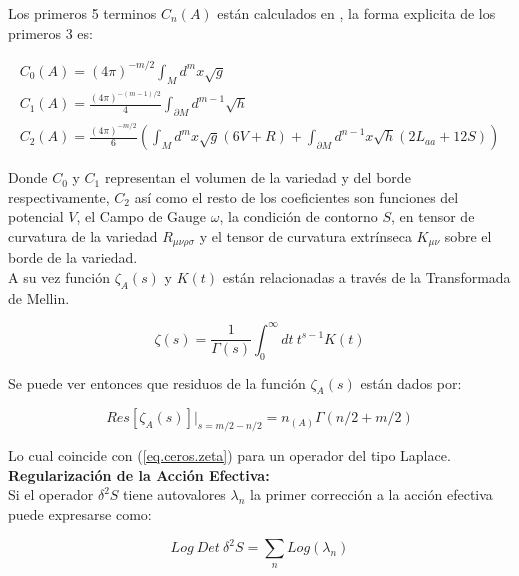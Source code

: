 Los primeros 5 terminos $C _n (A) $ están calculados en \cite{VASSILEVICH2003279}, la forma explicita de los primeros 3 es: 

\begin{equation}
\begin{array}{c}
C _0 (A) = (4 \pi ) ^{-m/2}  \int _M d ^m x \sqrt{g}  \\
C _1 (A) = \frac{(4 \pi) ^{-(m-1)/2} }{4} \int _{\partial M } d ^{m-1} \sqrt{h} \\
C _2 (A) = \frac{(4 \pi) ^{-m/2} }{6} \left(
									\int _M d ^m x\sqrt{g} (6 V + R) +
									\int _{\partial M } d ^{n-1} x 
									\sqrt{h} (2 L _{aa}  + 12 S)
									\right)
\end{array}
\end{equation} 

Donde $C _0$ y $C _1$ representan el volumen de la variedad y del borde respectivamente, $C _2$ así como el resto de los coeficientes son funciones del potencial $V$, el Campo de Gauge $\omega $, la condición de contorno $S$, en tensor de curvatura de la variedad $R _{\mu \nu \rho \sigma }$ y el tensor de curvatura extrínseca $K _{\mu \nu }$ sobre el borde de la variedad. \\

A su vez función $\zeta _A (s) $ y $K(t)$ están relacionadas a través de la Transformada de Mellin.



\begin{equation}
\zeta (s) = \frac{1}{\Gamma (s) } 
\int _0 ^{\infty} dt \
t ^{s-1} K(t) 
\end{equation}

Se puede ver entonces que residuos de la función $\zeta _A (s)$ están dados por:

\begin{equation}
Res[ \zeta _A (s) ] | _{s= m/2 - n/2} =  n _ {(A) } {\Gamma (n/2 + m/2)}
\end{equation}

Lo cual coincide con (\ref{eq.ceros.zeta}) para un operador del tipo Laplace. \\

\textbf{Regularización de la Acción Efectiva:} \\

Si el operador $\delta ^2 S$ tiene autovalores $\lambda _n$ la primer corrección a la acción efectiva puede expresarse como:

\begin{equation}
Log \ Det \ \delta ^2 S = 
\sum _n Log( \lambda _n )
\end{equation}

